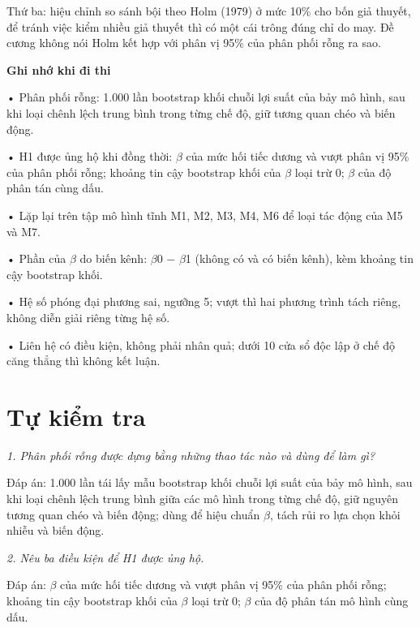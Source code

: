 Thứ ba: hiệu chỉnh so sánh bội theo Holm (1979) ở mức 10\% cho bốn giả thuyết, để tránh việc kiểm nhiều giả thuyết thì có một cái trông đúng chỉ do may. Đề cương không nói Holm kết hợp với phân vị 95\% của phân phối rỗng ra sao.

\begin{tcolorbox}[breakable]
\textbf{Ghi nhớ khi đi thi}

• Phân phối rỗng: 1.000 lần bootstrap khối chuỗi lợi suất của bảy mô hình, sau khi loại chênh lệch trung bình trong từng chế độ, giữ tương quan chéo và biến động.

• H1 được ủng hộ khi đồng thời: \texorpdfstring{$\beta$}{beta} của mức hối tiếc dương và vượt phân vị 95\% của phân phối rỗng; khoảng tin cậy bootstrap khối của \texorpdfstring{$\beta$}{beta} loại trừ 0; \texorpdfstring{$\beta$}{beta} của độ phân tán cùng dấu.

• Lặp lại trên tập mô hình tĩnh M1, M2, M3, M4, M6 để loại tác động của M5 và M7.

• Phần của \texorpdfstring{$\beta$}{beta} do biến kênh: \texorpdfstring{$\beta$}{beta}0 − \texorpdfstring{$\beta$}{beta}1 (không có và có biến kênh), kèm khoảng tin cậy bootstrap khối.

• Hệ số phóng đại phương sai, ngưỡng 5; vượt thì hai phương trình tách riêng, không diễn giải riêng từng hệ số.

• Liên hệ có điều kiện, không phải nhân quả; dưới 10 cửa sổ độc lập ở chế độ căng thẳng thì không kết luận.
\end{tcolorbox}

\section{Tự kiểm tra}

{\itshape 1. Phân phối rỗng được dựng bằng những thao tác nào và dùng để làm gì?\par}

Đáp án: 1.000 lần tái lấy mẫu bootstrap khối chuỗi lợi suất của bảy mô hình, sau khi loại chênh lệch trung bình giữa các mô hình trong từng chế độ, giữ nguyên tương quan chéo và biến động; dùng để hiệu chuẩn \texorpdfstring{$\beta$}{beta}, tách rủi ro lựa chọn khỏi nhiễu và biến động.

{\itshape 2. Nêu ba điều kiện để H1 được ủng hộ.\par}

Đáp án: \texorpdfstring{$\beta$}{beta} của mức hối tiếc dương và vượt phân vị 95\% của phân phối rỗng; khoảng tin cậy bootstrap khối của \texorpdfstring{$\beta$}{beta} loại trừ 0; \texorpdfstring{$\beta$}{beta} của độ phân tán mô hình cùng dấu.

